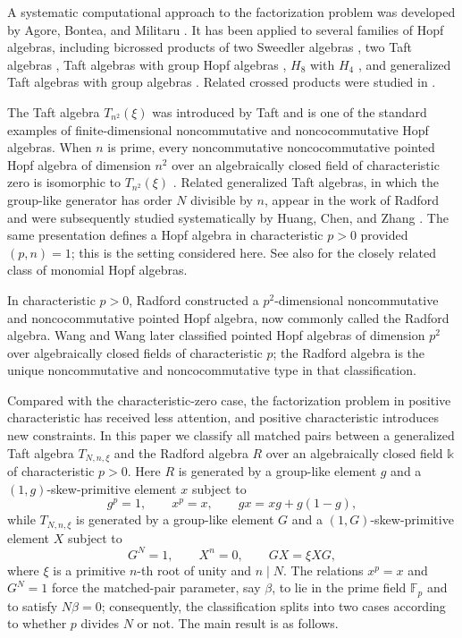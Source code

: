 \documentclass[twoside,11pt]{amsart}
\newcommand{\K}{\mathds{k}}
\newcommand{\F}{\mathbb{F}}
\begin{document}
	A systematic computational approach to the factorization problem was
	developed by Agore, Bontea, and Militaru \cite{ABM14}. It has been applied to
	several families of Hopf algebras, including bicrossed products of two
	Sweedler algebras \cite{Bontea14}, two Taft algebras \cite{Agore18-Taft},
	Taft algebras with group Hopf algebras \cite{Agore-Nastasescu17}, $H_8$ with
	$H_4$ \cite{Lu-Ning-Wang20}, and generalized Taft algebras with group 
	algebras \cite{Wang-Cheng-Lu22}. Related crossed products were studied in
	\cite{Agore-Bontea-Militaru14,Agore18-Cn}. 
	
	The Taft algebra $T_{n^2}(\xi)$ was introduced by Taft \cite{Taft71} and is
	one of the standard examples of finite-dimensional noncommutative and
	noncocommutative Hopf algebras. When $n$ is prime, every noncommutative noncocommutative pointed Hopf algebra of dimension $n^2$ over an
	algebraically closed field of characteristic zero  is isomorphic to $T_{n^2}(\xi)$ \cite{AS98}. Related generalized Taft algebras, in which the group-like
	generator has order $N$ divisible by $n$, appear in the work of Radford
	\cite{Radford75} and were subsequently studied systematically by Huang,
	Chen, and Zhang \cite{HCZ04}. The same presentation defines a Hopf algebra in
	characteristic $p>0$ provided $(p,n)=1$; this is the setting considered here.
	See also \cite{CHYZ04} for the closely related class of monomial Hopf
	algebras.
	
	In  characteristic $p>0$, Radford \cite{Radford77} constructed a
	$p^2$-dimensional noncommutative and noncocommutative pointed Hopf algebra,
	now commonly called the Radford algebra.  Wang and Wang \cite{WW14} later classified pointed Hopf algebras of
	dimension $p^2$ over algebraically closed fields of characteristic $p$; the
	Radford algebra is the unique noncommutative and noncocommutative type in
	that classification.
	
	Compared with the characteristic-zero case, the factorization problem in
	positive characteristic has received less attention, and positive
	characteristic introduces new constraints. In this paper we classify all
	matched pairs between a generalized Taft algebra $T_{N,n,\xi}$ and the
	Radford algebra $R$ over an algebraically closed field $\K$ of
	characteristic $p>0$. Here $R$ is generated by a group-like element $g$ and a $(1,g)$-skew-primitive element
	$x$ subject to
	\[
	g^p=1,\qquad x^p=x,\qquad gx=xg+g(1-g),
	\]
	while
	$T_{N,n,\xi}$ is generated by a group-like element $G$ and a
	$(1,G)$-skew-primitive element $X$ subject to 
	\[
	G^N=1,\qquad X^n=0,\qquad GX=\xi XG,
	\]
	where $\xi$ is a primitive $n$-th root of unity and $n\mid N$.
	The relations $x^p=x$ and $G^N=1$ force the matched-pair parameter, say
	$\beta$, to lie in the prime field $\F_p$ and to satisfy $N\beta=0$;
	consequently, the classification splits into two cases according to whether
	$p$ divides $N$ or not. The main result is as follows.
	
\end{document}
